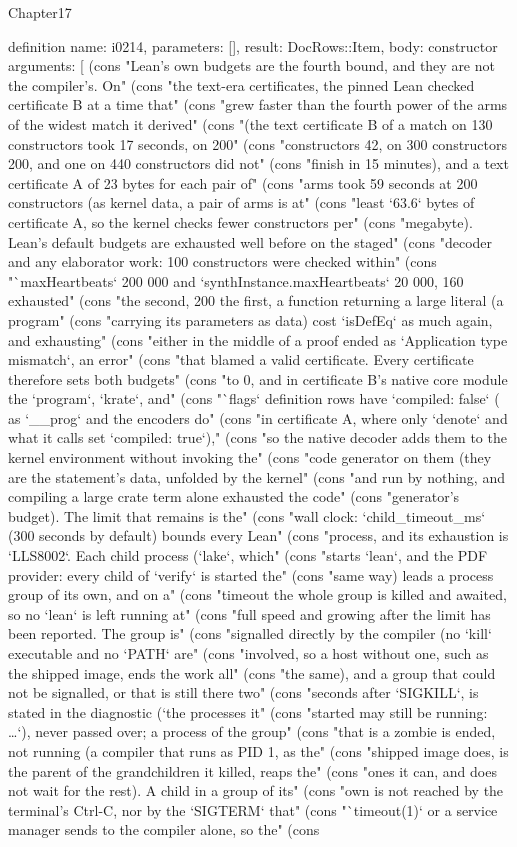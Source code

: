 \begin{lexlean}{Chapter17}
\begin{semanticmodule}
definition{
  name: i0214,
  parameters: [],
  result: DocRows::Item,
  body: constructor{
    arguments: [
      (cons "Lean's own budgets are the fourth bound, and they are not the compiler's. On" (cons "the text-era certificates, the pinned Lean checked certificate B at a time that" (cons "grew faster than the fourth power of the arms of the widest match it derived" (cons "(the text certificate B of a match on 130 constructors took 17 seconds, on 200" (cons "constructors 42, on 300 constructors 200, and one on 440 constructors did not" (cons "finish in 15 minutes), and a text certificate A of 23 bytes for each pair of" (cons "arms took 59 seconds at 200 constructors (as kernel data, a pair of arms is at" (cons "least `63.6` bytes of certificate A, so the kernel checks fewer constructors per" (cons "megabyte). Lean's default budgets are exhausted well before on the staged" (cons "decoder and any elaborator work: 100 constructors were checked within" (cons "`maxHeartbeats` 200 000 and `synthInstance.maxHeartbeats` 20 000, 160 exhausted" (cons "the second, 200 the first, a function returning a large literal (a program" (cons "carrying its parameters as data) cost `isDefEq` as much again, and exhausting" (cons "either in the middle of a proof ended as `Application type mismatch`, an error" (cons "that blamed a valid certificate. Every certificate therefore sets both budgets" (cons "to 0, and in certificate B's native core module the `program`, `krate`, and" (cons "`flags` definition rows have `compiled: false` ( as `__prog` and the encoders do" (cons "in certificate A, where only `denote` and what it calls set `compiled: true`)," (cons "so the native decoder adds them to the kernel environment without invoking the" (cons "code generator on them (they are the statement's data, unfolded by the kernel" (cons "and run by nothing, and compiling a large crate term alone exhausted the code" (cons "generator's budget). The limit that remains is the" (cons "wall clock: `child_timeout_ms` (300 seconds by default) bounds every Lean" (cons "process, and its exhaustion is `LLS8002`. Each child process (`lake`, which" (cons "starts `lean`, and the PDF provider: every child of `verify` is started the" (cons "same way) leads a process group of its own, and on a" (cons "timeout the whole group is killed and awaited, so no `lean` is left running at" (cons "full speed and growing after the limit has been reported. The group is" (cons "signalled directly by the compiler (no `kill` executable and no `PATH` are" (cons "involved, so a host without one, such as the shipped image, ends the work all" (cons "the same), and a group that could not be signalled, or that is still there two" (cons "seconds after `SIGKILL`, is stated in the diagnostic (`the processes it" (cons "started may still be running: …`), never passed over; a process of the group" (cons "that is a zombie is ended, not running (a compiler that runs as PID 1, as the" (cons "shipped image does, is the parent of the grandchildren it killed, reaps the" (cons "ones it can, and does not wait for the rest). A child in a group of its" (cons "own is not reached by the terminal's Ctrl-C, nor by the `SIGTERM` that" (cons "`timeout(1)` or a service manager sends to the compiler alone, so the" (cons }}
\end{semanticmodule}
\end{lexlean}
